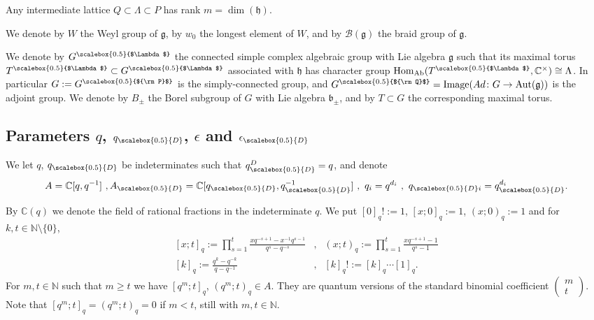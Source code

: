\documentclass[11pt]{amsart}
\newcommand{\e}{\epsilon}
\newcommand{\mc}{\mathbb{C}}
\newcommand{\mn}{\mathbb{N}}
\newcommand{\qD}{q_{\scalebox{0.5}{D}}}
\newcommand{\qDi}{q_{\scalebox{0.5}{D}i}}
\newcommand{\AD}{A_{\scalebox{0.5}{D}}}
\newcommand{\Q}{{\scalebox{0.5}{${\rm Q}$}}}
\newcommand{\Pup}{{\scalebox{0.5}{${\rm P}$}}}
\newcommand{\Lam}{{\scalebox{0.5}{$\Lambda$}}}
\begin{document}
\noindent Any intermediate lattice $Q\subset \Lambda\subset P$ has rank $m = \dim(\mathfrak{h})$. 

\indent We denote by $W$ the Weyl group of $\mathfrak{g}$, by $w_0$ the longest element of $W$, and by ${\mathcal B}(\mathfrak{g})$ the braid group of $\mathfrak{g}$.

\indent We denote by $G^{\Lam}$ the connected simple complex algebraic group with Lie algebra $\mathfrak{g}$ such that its maximal torus $T^{\Lam}\subset G^{\Lam}$ associated with $\mathfrak{h}$ has character group ${\rm Hom}_{\rm Ab}(T^{\Lam},\mc^\times)\cong \Lambda$. In particular $G := G^{\Pup}$ is the simply-connected group, and $G^\Q ={\rm Image}(Ad\colon G \to {\rm Aut}(\mathfrak{g}))$ is the adjoint group. We denote by $B_\pm$ the Borel subgroup of $G$ with Lie algebra $\mathfrak{b}_\pm$, and by $T\subset G$ the corresponding maximal torus. 

\subsection{Parameters \texorpdfstring{$q$}{q}, \texorpdfstring{$q_{\scalebox{0.5}{D}}$}{qD}, \texorpdfstring{$\e$}{e} and \texorpdfstring{$\e_{\scalebox{0.5}{D}}$}{eD}}\label{secnotationq}
We let $q$, $\qD$ be indeterminates such that $\qD^D=q$, and denote $$A=\mc[q,q^{-1}]\ , \AD =\mc[\qD,\qD^{-1}]\ ,\ q_i=q^{d_i}\ ,\ \qDi=\qD^{d_i}.$$

By $\mathbb{C}(q)$ we denote the field of rational fractions in the indeterminate $q$. We put $[0]_q !:=1$, $[ x; 0]_{q}:=1$, $(x; 0)_{q}:=1$ and for $k,t\in \mathbb{N}\setminus \{0\}$, 
$$\begin{array}{ccc} [ x; t ]_{q}:= \prod_{s=1}^t \frac{xq^{-s+1}-x^{-1}q^{s-1}}{q^s-q^{-s}} & , & (x; t )_{q}:= \prod_{s=1}^t \frac{xq^{-s+1}-1}{q^s-1}\\ \left[ k \right]_q:=\frac{q^k-q^{-k}}{q-q^{-1}} & , & [k]_q!:=[k]_q\cdots [1]_q.
\end{array}$$
For $m,t\in \mn$ such that $m\geq t$ we have $[ q^m; t ]_{q}$, $(q^m; t )_{q} \in A$. They are quantum versions of the standard binomial coefficient $\begin{pmatrix} m \\ t \end{pmatrix}$. Note that $[q^m;t]_q = (q^m;t)_q = 0$ if $m < t$, still with $m,t \in \mathbb{N}$.
\end{document}
